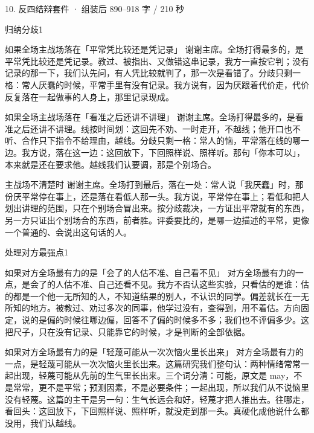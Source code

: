 \documentclass[script,con]{debate}
\begin{document}
\begin{kit}{10. 反四结辩}{套件 · 组装后 890–918 字 / 210 秒}
\begin{pick}{归纳分歧}{1}
\begin{module}{如果全场主战场落在「平常凭比较还是凭记录」}
谢谢主席。全场打得最多的，是平常凭比较还是凭记录。教过、被指出、又做错这串记录，我方一直按它判；没有记录的那一下，我们认先问，有人凭比较就判了，那一次是看错了。分歧只剩一格：常人厌蠢的时候，平常手里有没有记录。我方说有，因为厌跟着代价走，代价反复落在一起做事的人身上，那里记录现成。
\end{module}
\begin{module}{如果全场主战场落在「看准之后还讲不讲理」}
谢谢主席。全场打得最多的，是看准之后还讲不讲理。线按时间划：这回先不劝、一时走开，不越线；他开口也不听、合作只下指令不给理由，越线。分歧只剩一格：常人的恼，平常落在线的哪一边。我方说，落在这一边：这回放下，下回照样说、照样听。那句「你本可以」，本来就是还在要求他。越线我们认要调，那是个别场合。
\end{module}
\begin{fallback}{主战场不清楚时}
谢谢主席。全场打到最后，落在一处：常人说「我厌蠢」时，那份厌平常停在事上，还是落在看低人那一头。我方说，平常停在事上；看低和把人划出讲理的范围，只在个别场合冒出来。按分歧裁决，一方证出平常就有的东西，另一方只证出个别场合的东西，前者胜。评委要比的，是哪一边描述的平常，更像一个普通的、会说出这句话的人。
\end{fallback}
\end{pick}
\begin{pick}{处理对方最强点}{1}
\begin{module}{如果对方全场最有力的是「会了的人估不准、自己看不见」}
对方全场最有力的一点，是会了的人估不准、自己还看不见。我方不否认这些实验，只看估的是谁：估的都是一个他一无所知的人，不知道结果的别人，不认识的同学。偏差就长在一无所知的地方。被教过、劝过多次的同事，他学过没有，查得到，用不着估。方向固定，说的是偏的时候往哪边偏，回答不了偏的时候多不多；我们也不评偏多少。这把尺子，只在没有记录、只能靠它的时候，才是判断的全部依据。
\end{module}
\begin{module}{如果对方全场最有力的是「轻蔑可能从一次次恼火里长出来」}
对方全场最有力的一点，是轻蔑可能从一次次恼火里长出来。这篇研究我们整句认：两种情绪常常一起出现，轻蔑可能从先前的生气里长出来。三个词分清：可能，原文是 may，不是常常，更不是平常；预测因素，不是必要条件；一起出现，所以我们从不说恼里没有轻蔑。这篇的主干是另一句：生气长远会和好，轻蔑才把人推出去。往哪走，看回头：这回放下，下回照样说、照样听，就没走到那一头。真硬化成他说什么都没用，我们认越线。

\end{module}
\end{pick}
\end{kit}
\end{document}

